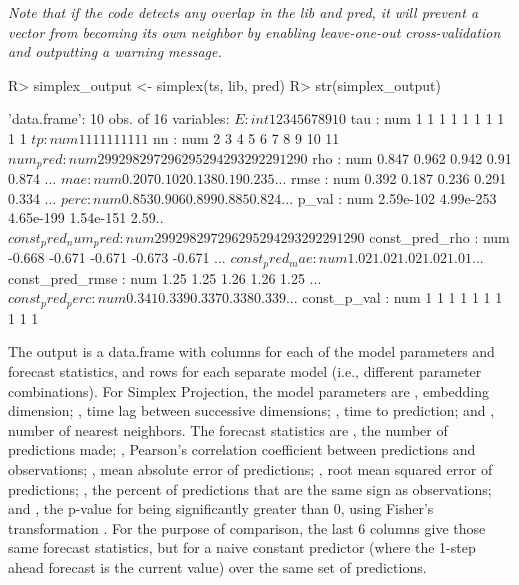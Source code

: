 \documentclass[article]{jss}
\begin{document}
\emph{Note that if the code detects any overlap in the lib and pred, it will prevent a vector from becoming its own neighbor by enabling leave-one-out cross-validation and outputting a warning message.}

\begin{Schunk}
\begin{Sinput}
R> simplex_output <- simplex(ts, lib, pred)
R> str(simplex_output)
\end{Sinput}
\begin{Soutput}
'data.frame':	10 obs. of  16 variables:
 $ E                  : int  1 2 3 4 5 6 7 8 9 10
 $ tau                : num  1 1 1 1 1 1 1 1 1 1
 $ tp                 : num  1 1 1 1 1 1 1 1 1 1
 $ nn                 : num  2 3 4 5 6 7 8 9 10 11
 $ num_pred           : num  299 298 297 296 295 294 293 292 291 290
 $ rho                : num  0.847 0.962 0.942 0.91 0.874 ...
 $ mae                : num  0.207 0.102 0.138 0.19 0.235 ...
 $ rmse               : num  0.392 0.187 0.236 0.291 0.334 ...
 $ perc               : num  0.853 0.906 0.899 0.885 0.824 ...
 $ p_val              : num  2.59e-102 4.99e-253 4.65e-199 1.54e-151 2.59..
 $ const_pred_num_pred: num  299 298 297 296 295 294 293 292 291 290
 $ const_pred_rho     : num  -0.668 -0.671 -0.671 -0.673 -0.671 ...
 $ const_pred_mae     : num  1.02 1.02 1.02 1.02 1.01 ...
 $ const_pred_rmse    : num  1.25 1.25 1.26 1.26 1.25 ...
 $ const_pred_perc    : num  0.341 0.339 0.337 0.338 0.339 ...
 $ const_p_val        : num  1 1 1 1 1 1 1 1 1 1
\end{Soutput}
\end{Schunk}

The output is a data.frame with columns for each of the model parameters and forecast statistics, and rows for each separate model (i.e., different parameter combinations). For Simplex Projection, the model parameters are , embedding dimension; , time lag between successive dimensions; , time to prediction; and , number of nearest neighbors. The forecast statistics are , the number of predictions made; , Pearson's correlation coefficient between predictions and observations; , mean absolute error of predictions; , root mean squared error of predictions; , the percent of predictions that are the same sign as observations; and , the p-value for  being significantly greater than 0, using Fisher's transformation \citep{Fisher_1915}. For the purpose of comparison, the last 6 columns give those same forecast statistics, but for a naive constant predictor (where the 1-step ahead forecast is the current value) over the same set of predictions.
\end{document}
